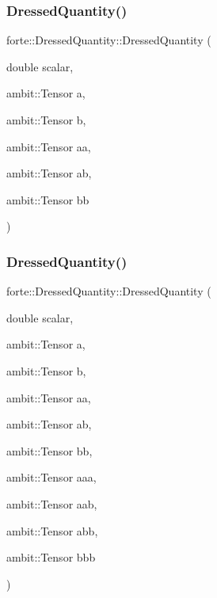 \mbox{\label{classforte_1_1_dressed_quantity_a13194b9e4e59de0d776ec546d24917a6}} 
\subsubsection{\texorpdfstring{Dressed\+Quantity()}{DressedQuantity()}\hspace{0.1cm}{\footnotesize\ttfamily [4/5]}}
{\footnotesize\ttfamily forte\+::\+Dressed\+Quantity\+::\+Dressed\+Quantity (\begin{DoxyParamCaption}\item[{double}]{scalar,  }\item[{ambit\+::\+Tensor}]{a,  }\item[{ambit\+::\+Tensor}]{b,  }\item[{ambit\+::\+Tensor}]{aa,  }\item[{ambit\+::\+Tensor}]{ab,  }\item[{ambit\+::\+Tensor}]{bb }\end{DoxyParamCaption})}

\mbox{\label{classforte_1_1_dressed_quantity_a8f7a52a1b07c6b79a41db6dd410328f1}} 
\subsubsection{\texorpdfstring{Dressed\+Quantity()}{DressedQuantity()}\hspace{0.1cm}{\footnotesize\ttfamily [5/5]}}
{\footnotesize\ttfamily forte\+::\+Dressed\+Quantity\+::\+Dressed\+Quantity (\begin{DoxyParamCaption}\item[{double}]{scalar,  }\item[{ambit\+::\+Tensor}]{a,  }\item[{ambit\+::\+Tensor}]{b,  }\item[{ambit\+::\+Tensor}]{aa,  }\item[{ambit\+::\+Tensor}]{ab,  }\item[{ambit\+::\+Tensor}]{bb,  }\item[{ambit\+::\+Tensor}]{aaa,  }\item[{ambit\+::\+Tensor}]{aab,  }\item[{ambit\+::\+Tensor}]{abb,  }\item[{ambit\+::\+Tensor}]{bbb }\end{DoxyParamCaption})}



